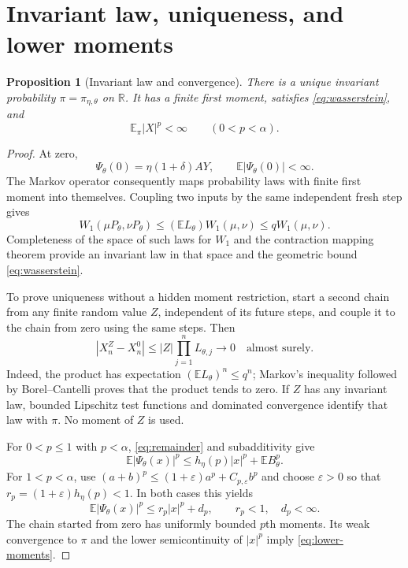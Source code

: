 \documentclass[11pt,a4paper]{article}
\numberwithin{equation}{section}
\newtheorem{proposition}[theorem]{Proposition}
\theoremstyle{remark}
\newcommand{\E}{\mathbb E}
\newcommand{\R}{\mathbb R}
\begin{document}
\section{Invariant law, uniqueness, and lower moments}\label{sec:invariance}

\begin{proposition}[Invariant law and convergence]\label{prop:invariant}
There is a unique invariant probability $\pi=\pi_{\eta,\theta}$ on $\R$.
It has a finite first moment, satisfies \eqref{eq:wasserstein}, and
\begin{equation}
 \E_\pi|X|^p<\infty\qquad(0<p<\alpha).\label{eq:lower-moments}
\end{equation}
\end{proposition}

\begin{proof}
At zero,
\begin{equation}
 \Psi_\theta(0)=\eta(1+\delta)AY,\qquad
 \E|\Psi_\theta(0)|<\infty.\label{eq:update-zero}
\end{equation}
The Markov operator consequently maps probability laws with finite first
moment into themselves. Coupling two inputs by the same independent fresh
step gives
\begin{equation}
 W_1(\mu P_\theta,\nu P_\theta)
 \le(\E L_\theta)W_1(\mu,\nu)\le qW_1(\mu,\nu).
 \label{eq:W-contraction}
\end{equation}
Completeness of the space of such laws for $W_1$ and the contraction
mapping theorem provide an invariant law in that space and the geometric
bound \eqref{eq:wasserstein}.

To prove uniqueness without a hidden moment restriction, start a second
chain from any finite random value $Z$, independent of its future steps,
and couple it to the chain from zero using the same steps. Then
\begin{equation}
 |X_n^Z-X_n^0|\le |Z|\prod_{j=1}^n L_{\theta,j}
   \longrightarrow0\quad\text{almost surely}.\label{eq:path-coupling}
\end{equation}
Indeed, the product has expectation $(\E L_\theta)^n\le q^n$;
Markov's inequality followed by Borel--Cantelli proves that the product
tends to zero. If $Z$ has any invariant law, bounded Lipschitz test
functions and dominated convergence identify that law with $\pi$.
No moment of $Z$ is used.

For $0<p\le1$ with $p<\alpha$, \eqref{eq:remainder} and subadditivity
give
\begin{equation}
 \E|\Psi_\theta(x)|^p\le h_\eta(p)|x|^p+\E B_\theta^p.
 \label{eq:drift-small-p}
\end{equation}
For $1<p<\alpha$, use
$(a+b)^p\le(1+\varepsilon)a^p+C_{p,\varepsilon}b^p$ and choose
$\varepsilon>0$ so that $r_p=(1+\varepsilon)h_\eta(p)<1$.
In both cases this yields
\begin{equation}
 \E|\Psi_\theta(x)|^p\le r_p|x|^p+d_p,
 \qquad r_p<1,\quad d_p<\infty.\label{eq:moment-drift}
\end{equation}
The chain started from zero has uniformly bounded $p$th moments. Its
weak convergence to $\pi$ and the lower semicontinuity of $|x|^p$ imply
\eqref{eq:lower-moments}.
\end{proof}
\end{document}
